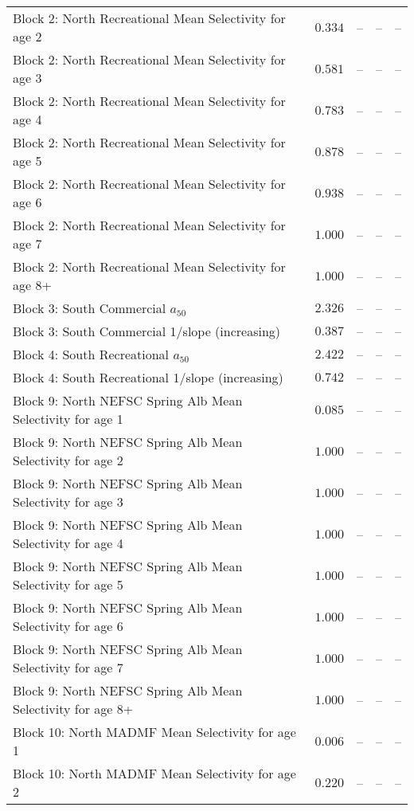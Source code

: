 \documentclass[
]{article}
\begin{document}
\begin{landscape}
\begin{longtable}[t]{lrrrr}
\addlinespace
Block 2: North Recreational Mean Selectivity for age 2 & $0.334$ & -- & -- & --\\
Block 2: North Recreational Mean Selectivity for age 3 & $0.581$ & -- & -- & --\\
Block 2: North Recreational Mean Selectivity for age 4 & $0.783$ & -- & -- & --\\
Block 2: North Recreational Mean Selectivity for age 5 & $0.878$ & -- & -- & --\\
Block 2: North Recreational Mean Selectivity for age 6 & $0.938$ & -- & -- & --\\
\addlinespace
Block 2: North Recreational Mean Selectivity for age 7 & $1.000$ & -- & -- & --\\
Block 2: North Recreational Mean Selectivity for age 8+ & $1.000$ & -- & -- & --\\
Block 3: South Commercial $a_{50}$ & $2.326$ & -- & -- & --\\
Block 3: South Commercial 1/slope (increasing) & $0.387$ & -- & -- & --\\
Block 4: South Recreational $a_{50}$ & $2.422$ & -- & -- & --\\
\addlinespace
Block 4: South Recreational 1/slope (increasing) & $0.742$ & -- & -- & --\\
Block 9: North NEFSC Spring Alb Mean Selectivity for age 1 & $0.085$ & -- & -- & --\\
Block 9: North NEFSC Spring Alb Mean Selectivity for age 2 & $1.000$ & -- & -- & --\\
Block 9: North NEFSC Spring Alb Mean Selectivity for age 3 & $1.000$ & -- & -- & --\\
Block 9: North NEFSC Spring Alb Mean Selectivity for age 4 & $1.000$ & -- & -- & --\\
\addlinespace
Block 9: North NEFSC Spring Alb Mean Selectivity for age 5 & $1.000$ & -- & -- & --\\
Block 9: North NEFSC Spring Alb Mean Selectivity for age 6 & $1.000$ & -- & -- & --\\
Block 9: North NEFSC Spring Alb Mean Selectivity for age 7 & $1.000$ & -- & -- & --\\
Block 9: North NEFSC Spring Alb Mean Selectivity for age 8+ & $1.000$ & -- & -- & --\\
Block 10: North MADMF Mean Selectivity for age 1 & $0.006$ & -- & -- & --\\
\addlinespace
Block 10: North MADMF Mean Selectivity for age 2 & $0.220$ & -- & -- & --\\

\end{longtable}
\end{landscape}
\end{document}

